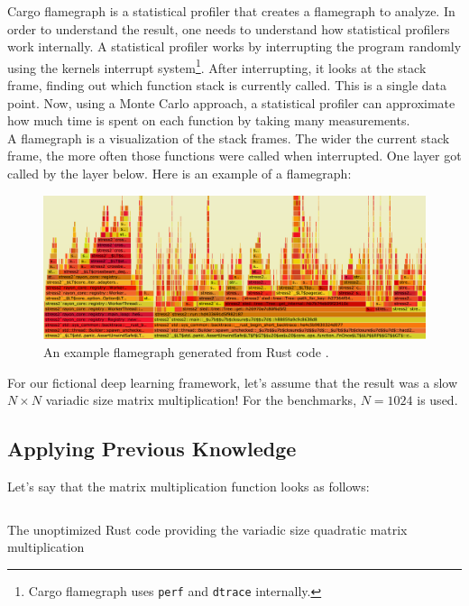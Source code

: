 Cargo flamegraph \cite{flamegraph} is a statistical profiler that creates a flamegraph to analyze. In order to understand the result, one needs to understand how statistical profilers work internally.
A statistical profiler works by interrupting the program randomly using the kernels interrupt system\footnote{Cargo flamegraph uses \texttt{perf} and \texttt{dtrace} internally.}. After interrupting, it looks at the stack frame, finding out which function stack is currently called. This is a single data point. Now, using a Monte Carlo approach, a statistical profiler can approximate how much time is spent on each function by taking many measurements.\\

A flamegraph is a visualization of the stack frames. The wider the current stack frame, the more often those functions were called when interrupted. One layer got called by the layer below. Here is an example of a flamegraph:

\begin{figure}[H]
  \centering
  \includegraphics[width=\textwidth]{./assets/exampleflamegraph}
  \caption{An example flamegraph generated from Rust code \cite{flamegraph}.}
\end{figure}

For our fictional deep learning framework, let's assume that the result was a slow $N \times N$ variadic size matrix multiplication! For the benchmarks, $N=1024$ is used.

\subsection{Applying Previous Knowledge}
Let's say that the matrix multiplication function looks as follows:

\begin{listing}[H]
  \inputminted{rust}{./assets/variadic_unoptimized.rs}
\caption{The unoptimized Rust code providing the variadic size quadratic matrix multiplication}
\end{listing}

